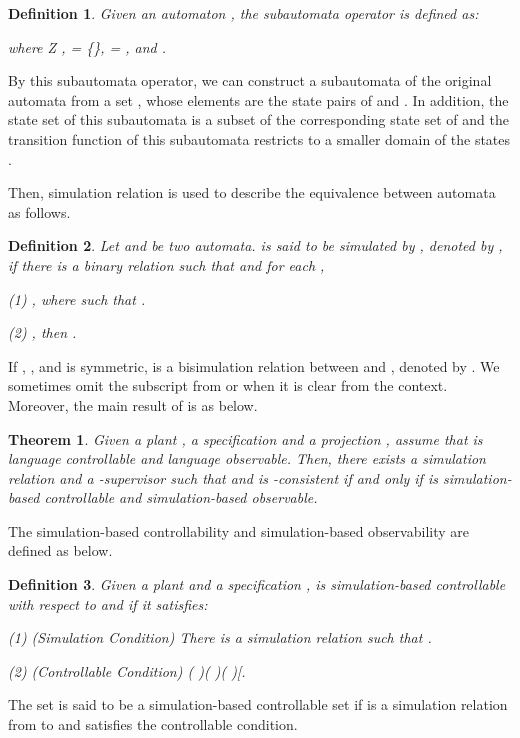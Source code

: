 \documentclass[12pt,draftcls,onecolumn]{IEEEtran}
\newtheorem{Theorem}{Theorem}
\newtheorem{Definition}{Definition}
\begin{document}
\begin{Definition}
Given an automaton , the
subautomata operator is defined as:

where Z ,  = \{\},  = , and .
\end{Definition}
By this subautomata operator, we can construct a subautomata of
the original automata  from a set , whose elements are the
state pairs of  and . In addition, the state set  of
this subautomata is a subset of the corresponding state set  of
 and the transition function of this subautomata restricts
 to a smaller domain of the states .


Then, simulation relation is used to describe the equivalence
between automata as follows.
\begin{Definition}
Let  and  be two automata. 
is said to be simulated by , denoted by , if there is a binary relation    such that  and for each
,

(1) , where 
such that .

(2) , then .

\end{Definition}
If , , and
 is symmetric,  is a bisimulation relation between
 and , denoted by . We
sometimes omit the subscript  from  or
 when it is clear from the context. Moreover, the
main result of \cite{liu} is as below.

\begin{Theorem}\label{tliu}
Given a plant , a specification
 and a projection , assume
that  is language controllable and language observable.
Then, there exists a simulation relation 
and a -supervisor  such that 
and  is -consistent if and only if
 is simulation-based controllable and simulation-based
observable.
\end{Theorem}

The simulation-based controllability and simulation-based
observability are defined as below.





\begin{Definition}
Given a plant  and a
specification ,  is
simulation-based controllable with respect to  and
 if it satisfies:

(1) (Simulation Condition) There is a simulation relation 
such that .

(2) (Controllable Condition) ( )( 
 )( )[.
\end{Definition}



The set  is said to be a
simulation-based controllable set if  is a
simulation relation from  to  and 
satisfies the controllable condition.
\end{document}
